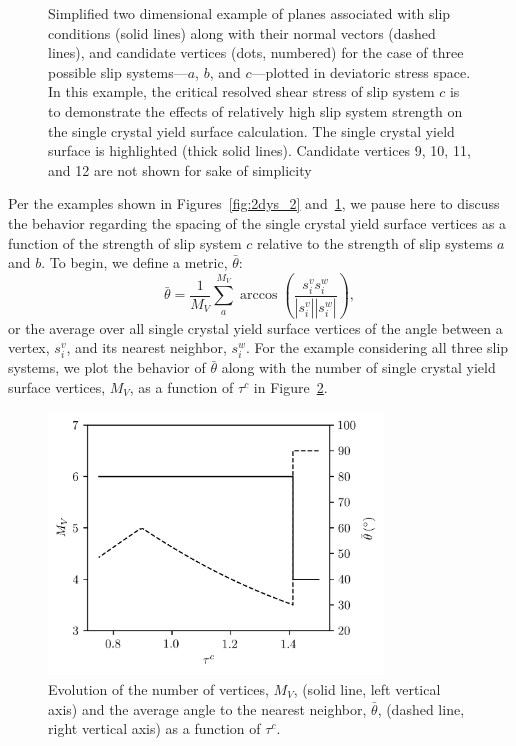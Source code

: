 \documentclass[preprint,3p,times,sort&compress,letterpaper,12pt]{elsarticle} %
\begin{document}
\begin{figure}[H]
{
    }
    \caption{Simplified two dimensional example of planes associated with slip conditions (solid lines) along with their normal vectors (dashed lines), and candidate vertices (dots, numbered) for the case of three possible slip systems---$a$, $b$, and $c$---plotted in deviatoric stress space. In this example, the critical resolved shear stress of slip system $c$ is to demonstrate the effects of relatively high slip system strength on the single crystal yield surface calculation. The single crystal yield surface is highlighted (thick solid lines). Candidate vertices 9, 10, 11, and 12 are not shown for sake of simplicity}
    \label{fig:2dys_4}
\end{figure}

Per the examples shown in Figures~\ref{fig:2dys_2} and~\ref{fig:2dys_4}, we pause here to discuss the behavior regarding the spacing of the single crystal yield surface vertices as a function of the strength of slip system $c$ relative to the strength of slip systems $a$ and $b$. To begin, we define a metric, $\bar{\theta}$:
\begin{equation}
    \label{eq:bartheta}
    \bar{\theta} = \frac{1}{M_V}\sum_{a}^{M_V}{\arccos{\left(\frac{s_i^v s_i^w}{\left|s_i^v\right|\left|s_i^w\right|}\right)}},
\end{equation}
or the average over all single crystal yield surface vertices of the angle between a vertex, $s^v_i$, and its nearest neighbor, $s_i^w$. For the example considering all three slip systems, we plot the behavior of $\bar{\theta}$ along with the number of single crystal yield surface vertices, $M_V$, as a function of $\tau^c$ in Figure~\ref{fig:2d_trends}.
\begin{figure}[H]
    \centering
    \includegraphics[width=3.5in]{2d_trends.png}
    \caption{Evolution of the number of vertices, $M_V$, (solid line, left vertical axis) and the average angle to the nearest neighbor, $\bar{\theta}$, (dashed line, right vertical axis) as a function of $\tau^c$.}
    \label{fig:2d_trends}
\end{figure}
\end{document}

